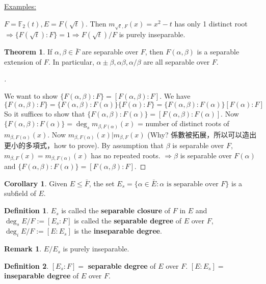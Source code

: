 \documentclass[12pt]{article}
\theoremstyle{definition}
\newtheorem{thm}{Theorem}
\newcommand{\ex}{\noindent\underline{Examples:}}
\newtheorem{dfn}{Definition}
\newtheorem{rem}{Remark}
\newtheorem{cor}{Corollary}
\newenvironment{proofs}[1][\proofname]{%
  \begin{proof}[#1]$ $\par\nobreak\ignorespaces
}{%
  \end{proof}
}
\begin{document}
\ex

$F = \mathbb{F}_2(t), E = F(\sqrt{t})$.
Then $m_{\sqrt{t}, F}(x) = x^2 - t$ has only 1 distinct root $\Rightarrow \{F(\sqrt{t}):F\} = 1 \Rightarrow F(\sqrt{t})/F$ is purely inseparable.

\begin{thm}
	If $\alpha, \beta \in \bar{F}$ are separable over $F$, then $F(\alpha, \beta)$ is a separable extension of $F$.
	In particular, $\alpha \pm \beta, \alpha \beta, \alpha/\beta$ are all separable over $F$.
\end{thm}

\begin{proofs}
	We want to show $\{F(\alpha, \beta) :F\} = [F(\alpha, \beta):F]$.
	We have
	\[
		\{F(\alpha, \beta):F\} = \{ F(\alpha, \beta):F(\alpha)\}\{F(\alpha):F\} = \{ F(\alpha, \beta):F(\alpha)\}[F(\alpha):F]
	\]
	So it suffices to show that $\{F(\alpha, \beta):F(\alpha)\} = [F(\alpha, \beta):F(\alpha)]$.
	Now $\{F(\alpha, \beta) :F(\alpha)\} = \deg_s m_{\beta, F(\alpha)}(x)$ = number of distinct roots of $m_{\beta, F(\alpha)}(x)$.
	Now $m_{\beta, F(\alpha)}(x) | m_{\beta, F}(x)$ (Why? 係數被拓展，所以可以造出更小的多項式，how to prove).
	By assumption that $\beta$ is separable over $F$, $m_{\beta, F}(x) = m_{\beta, F(\alpha)}(x)$ has no repeated roots.
	$\Rightarrow \beta$ is separable over $F(\alpha)$ and $\{F(\alpha, \beta):F(\alpha)\} = [F(\alpha, \beta):F]$.
\end{proofs}

\begin{cor}
	Given $E \leq \bar{F}$, the set $E_s = \{\alpha \in \bar{E}: \alpha \text{ is separable over }F\}$ is a subfield of $E$.
\end{cor}

\begin{dfn}
	$E_s$ is called the \textbf{separable closure} of $F$ in $E$ and $\deg_s E/F := [E_s:F]$ is called the \textbf{separable degree} of $E$ over $F$, $\deg_i E/F := [E:E_s]$ is the \textbf{inseparable degree}.
\end{dfn}

\begin{rem}
	$E/E_s$ is purely inseparable.
\end{rem}

\begin{dfn}
	$[E_s:F] = $ \textbf{separable degree} of $E$ over $F$.
	$[E:E_s] = $ \textbf{inseparable degree} of $E$ over $F$.
\end{dfn}
\end{document}
